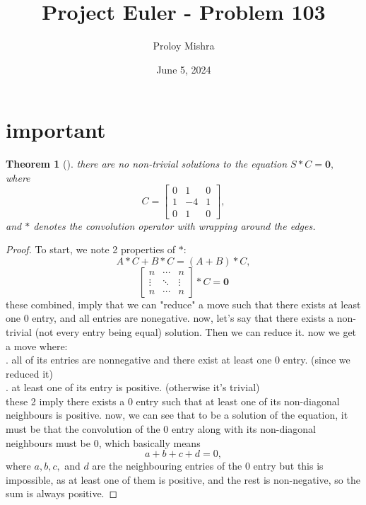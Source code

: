 \documentclass{article}
\title{Project Euler - Problem 103}
\author{Proloy Mishra}
\date{June 5, 2024}
\newtheorem{theorem}{Theorem}[section]
\begin{document}
   \maketitle
   \section{important}
   \begin{theorem}[]
    there are no non-trivial solutions to the equation $ S * C = \mathbf{0}, $ where
     $$ C =
     \begin{bmatrix}
        0 & 1 & 0 \\
        1 & -4 & 1 \\
        0 & 1 & 0
     \end{bmatrix}
        , $$ and $ * $ denotes the convolution operator with wrapping around the edges.
    \end{theorem}
    \begin{proof}
      To start, we note 2 properties of $ * $: \\
         $$ A * C + B * C = (A + B) * C, $$
         $$  \left[
\begin{array}{ccc}
   n & \cdots & n \\
   \vdots & \ddots & \vdots \\
   n & \cdots & n
\end{array}
\right] * C = \mathbf{0} $$
      these combined, imply that we can "reduce" a move such that there exists at least one 0 entry, and all entries are nonegative.
      now, let's say that there exists a non-trivial (not every entry being equal) solution. Then we can reduce it. now we get a move where:\\
       . all of its entries are nonnegative and there exist at least one 0 entry. (since we reduced it)\\
       . at least one of its entry is positive. (otherwise it's trivial) \\
     these 2 imply there exists a 0 entry such that at least one of its non-diagonal neighbours is positive.
     now, we can see that to be a solution of the equation, it must be that the convolution of the 0 entry along with its non-diagonal neighbours must be 0,
      which basically means
       $$ a + b + c + d = 0, $$
      where $a, b, c, $ and  $d$ are the neighbouring entries of the 0 entry
      but this is impossible, as at least one of them is positive, and the rest is non-negative, so the sum is always positive.
    \end{proof}
\end{document}
